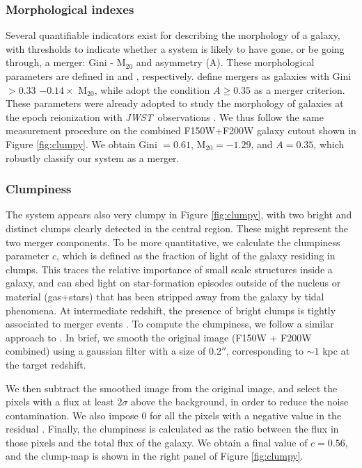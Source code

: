 \documentclass[sn-mathphys]{sn-jnl}%
\theoremstyle{thmstyleone}%
\theoremstyle{thmstyletwo}%
\theoremstyle{thmstylethree}%
\newcommand{\jwst}{\textit{JWST}}
\begin{document}
\subsubsection{Morphological indexes}
Several quantifiable indicators exist for describing the morphology of a galaxy, with thresholds to indicate whether a system is likely to have gone, or be going through, a merger: Gini - M$_{20}$ and asymmetry (A). 
These morphological parameters are defined in \cite{Lotz04, Lotz08} and \cite{Abraham03}, respectively. \cite{Lotz08} define mergers as galaxies with Gini $> 0.33$ $- 0.14 \times$ M$_{20}$, while \cite{Conselice03} adopt the condition $A \geq 0.35$ as a merger criterion. 
These parameters were already adopted to study the morphology of galaxies at the epoch reionization with \jwst\ observations \citep{Treu23}. We thus follow the same measurement procedure on the combined F150W+F200W galaxy cutout shown in Figure \ref{fig:clumpy}. We obtain Gini $=0.61$, M$_{20} = -1.29$, and $A=0.35$, which robustly classify our system as a merger. 

\subsubsection{Clumpiness}
The system appears also very clumpy in Figure \ref{fig:clumpy}, with two bright and distinct clumps clearly detected in the central region. These might represent the two merger components. To be more quantitative, we calculate the clumpiness parameter $c$, which is defined as the fraction of light of the galaxy residing in clumps. This traces the relative importance of small scale structures inside a galaxy, and can shed light on star-formation episodes outside of the nucleus or material (gas+stars) that has been stripped away from the galaxy by tidal phenomena. At intermediate redshift, the presence of bright clumps is tightly associated to merger events \citep{Calabro19}. 
To compute the clumpiness, we follow a similar approach to \cite{Calabro19}. In brief, we smooth the original image (F150W + F200W combined) using a gaussian filter with a size of $0.2''$, corresponding to $\sim1$ kpc at the target redshift. 

We then subtract the smoothed image from the original image, and select the pixels with a flux at least $2\sigma$ above the background, in order to reduce the noise contamination. We also impose $0$ for all the pixels with a negative value in the residual \citep{Conselice03}. Finally, the clumpiness is calculated as the ratio between the flux in those pixels and the total flux of the galaxy. 
We obtain a final value of $c = 0.56$, and the clump-map is shown in the right panel of Figure \ref{fig:clumpy}. 
\end{document}

